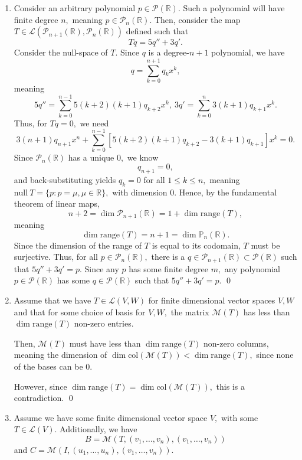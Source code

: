 \documentclass[12pt]{article}
\begin{document}
\begin{enumerate}
  \item Consider an arbitrary polynomial $p \in \mathcal P(\mathbb
    R).$ Such a polynomial will have finite degree $n,$ meaning $p
    \in \mathcal P_n(\mathbb R).$ Then, consider the map $T \in
    \mathcal L(\mathcal P_{n + 1}(\mathbb R), \mathcal P_{n}(\mathbb
    R))$ defined such that
    $$
    Tq = 5q'' + 3q'.
    $$
    Consider the null-space of $T.$ Since $q$ is a degree-$n + 1$
    polynomial, we have
    $$
    q = \sum_{k = 0}^{n + 1} q_k x^k,
    $$
    meaning
    $$
    5q'' = \sum_{k = 0}^{n - 1} 5(k+2)(k + 1)q_{k + 2} x^{k}, \ 3q' =
    \sum_{k = 0}^{n} 3(k+1)q_{k + 1} x^{k}.
    $$
    Thus, for $Tq = 0,$ we need
    $$
    3(n + 1)q_{n + 1}x^{n} + \sum_{k = 0}^{n-1} [5(k+2)(k+1)q_{k + 2}
    - 3(k + 1)q_{k + 1}]  x^k = 0.
    $$
    Since $\mathcal P_{n}(\mathbb R)$ has a unique $0,$ we know
    $$
    q_{n + 1} = 0,
    $$
    and back-substituting yields $q_k = 0$ for all $1 \leq k \leq n,$
    meaning $\text{null}\ T = \{p: p = \mu, \mu \in \mathbb R\},$
    with dimension $0.$ Hence, by the fundamental theorem of linear maps,
    $$
    n + 2=\dim \mathcal P_{n + 1}(\mathbb R) = 1 + \dim\text{range}(T),
    $$
    meaning $$
    \dim \text{range}(T) = n + 1 = \dim \mathbb P_n(\mathbb R).
    $$
    Since the dimension of the range of $T$ is equal to its codomain,
    $T$ must be surjective. Thus, for all $p \in \mathcal
    P_{n}(\mathbb R),$ there is a $q \in \mathcal P_{n + 1}(\mathbb
    R) \subset \mathcal P(\mathbb R)$ such that $5q'' + 3q' = p.$
    Since any $p$ has some finite degree $m,$ any polynomial $p \in
    \mathcal P(\mathbb R)$ has some $q \in \mathcal P(\mathbb R)$
    such that $5q'' + 3q' = p.$  \qed

  \item Assume that we have $T \in \mathcal L(V, W)$ for finite
    dimensional vector spaces $V, W$ and that for some choice of
    basis for $V, W,$ the matrix $\mathcal M(T)$ has less than $\dim
    \text{range}(T)$ non-zero entries.

    Then, $\mathcal M(T)$ must have less than $\dim \text{range}(T)$
    non-zero columns, meaning the dimension of $\dim
    \text{col}(\mathcal M(T)) < \dim \text{range}(T),$ since none of
    the bases can be $0.$

    However, since $\dim \text{range}(T) = \dim \text{col}(\mathcal
    M(T)),$ this is a contradiction. \qed

  \item Assume we have some finite dimensional vector space $V,$ with
    some $T \in \mathcal L(V).$ Additionally, we have $$
    B = \mathcal M(T, (v_1, \ldots, v_n), (v_1, \ldots, v_n))
    $$
    and $C = \mathcal M(I, (u_1, \ldots, u_n), (v_1, \ldots, v_n)).$


\end{enumerate}
\end{document}
